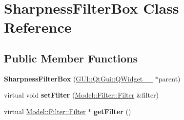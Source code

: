 \hypertarget{classGUI_1_1SharpnessFilterBox}{}\section{Sharpness\+Filter\+Box Class Reference}
\label{classGUI_1_1SharpnessFilterBox}
\subsection*{Public Member Functions}
\begin{DoxyCompactItemize}
\item 
\hypertarget{classGUI_1_1SharpnessFilterBox_a3c0fbc686b0245d71884f554c3dcf73c}{}{\bfseries Sharpness\+Filter\+Box} (\hyperlink{classGUI_1_1QtGui_1_1QWidget____10}{G\+U\+I\+::\+Qt\+Gui\+::\+Q\+Widget\+\_\+\+\_} $\ast$parent)\label{classGUI_1_1SharpnessFilterBox_a3c0fbc686b0245d71884f554c3dcf73c}

\item 
\hypertarget{classGUI_1_1SharpnessFilterBox_ad7c0ee00fe3faac7942d75eec2a5342b}{}virtual void {\bfseries set\+Filter} (\hyperlink{classModel_1_1Filter_1_1Filter}{Model\+::\+Filter\+::\+Filter} \&filter)\label{classGUI_1_1SharpnessFilterBox_ad7c0ee00fe3faac7942d75eec2a5342b}

\item 
\hypertarget{classGUI_1_1SharpnessFilterBox_acef2029a93f4ab3a538cdb643b9c2613}{}virtual \hyperlink{classModel_1_1Filter_1_1Filter}{Model\+::\+Filter\+::\+Filter} $\ast$ {\bfseries get\+Filter} ()\label{classGUI_1_1SharpnessFilterBox_acef2029a93f4ab3a538cdb643b9c2613}

\end{DoxyCompactItemize}

